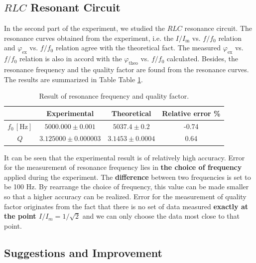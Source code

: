 \documentclass{article}
\begin{document}
\subsection{$RLC$ Resonant Circuit}


In the second part of the experiment, we studied the $RLC$ resonance circuit. The resonance curves obtained from the experiment, i.e. the $I/I_\text{m}$ vs. $f/f_0$ relation and $\varphi_\text{ex}$ vs. $f/f_0$ relation agree with the theoretical fact. The measured $\varphi_\text{ex}$ vs. $f/f_0$ relation is also in accord with the $\varphi_\text{theo}$ vs. $f/f_0$ calculated. Besides, the resonance frequency and the quality factor are found from the resonance curves. The results are summarized in Table Table \ref{tab:fQ}.

\begin{table}[H] \centering
    \begin{tabular}{cccc}
        \toprule
                           & Experimental           & Theoretical        & Relative error \% \\
        \midrule
        $f_0\,[\text{Hz}]$ & $5000.000\pm 0.001$    & $5037.4\pm 0.2$    & -0.74             \\
        $Q$                & $3.125000\pm 0.000003$ & $3.1453\pm 0.0004$ & 0.64              \\
        \bottomrule
    \end{tabular}
    \caption{Result of resonance frequency and quality factor.}
    \label{tab:fQ}
\end{table}

It can be seen that the experimental result is of relatively high accuracy. Error for the measurement of resonance frequency lies in \textbf{the choice of frequency} applied during the experiment. The \textbf{difference} between two frequencies is set to be 100 Hz. By rearrange the choice of frequency, this value can be made smaller so that a higher accuracy can be realized. Error for the measurement of quality factor originates from the fact that there is no set of data measured \textbf{exactly at the point $I/I_m = 1/\sqrt{2}$} and we can only choose the data most close to that point.

\subsection{Suggestions and Improvement}
\end{document}
